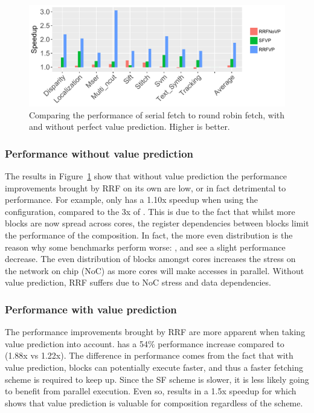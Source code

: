 \begin{figure}[t]
    \centering
    \includegraphics[width=1\textwidth]{chapter3/graphics/tempres4.pdf}
    \caption{Comparing the performance of serial fetch to round robin fetch, with and without perfect value prediction. Higher is better.}
    \label{fig:perf_pred}
\end{figure}

\subsubsection{Performance without value prediction}
The results in Figure~\ref{fig:perf_pred} show that without value prediction the performance improvements brought by RRF on its own are low, or in fact detrimental to performance.
For example,  only has a 1.10x speedup when using the \nfnovp{} configuration, compared to the 3x of \nfvp{}.
This is due to the fact that whilst more blocks are now spread across cores, the register dependencies between blocks limit the performance of the composition. 
In fact, the more even distribution is the reason why some benchmarks perform worse: ,  and  see a slight performance decrease.
The even distribution of blocks amongst cores increases the stress on the network on chip (NoC) as more cores will make accesses in parallel.
Without value prediction, RRF suffers due to NoC stress and data dependencies.



\subsubsection{Performance with value prediction}
The performance improvements brought by RRF are more apparent when taking value prediction into account.
\nfvp{} has a 54\% performance increase compared to \vp{} (1.88x vs 1.22x).
The difference in performance comes from the fact that with value prediction, blocks can potentially execute faster, and thus a faster fetching scheme is required to keep up.
Since the SF scheme is slower, it is less likely going to benefit from parallel execution.
Even so, \vp{} results in a 1.5x speedup for  which shows that value prediction is valuable for composition regardless of the scheme.


